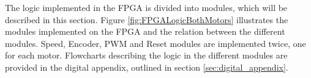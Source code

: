 \documentclass[../../main.tex]{subfiles}
\begin{document}
The logic implemented in the FPGA is divided into modules, which will be described in this section. Figure \ref{fig:FPGALogicBothMotors} illustrates the modules implemented on the FPGA and the relation between the different modules. Speed, Encoder, PWM and Reset modules are implemented twice, one for each motor. Flowcharts describing the logic in the different modules are provided in the digital appendix, outlined in section \ref{sec:digital_appendix}.      
    
    
\end{document}
